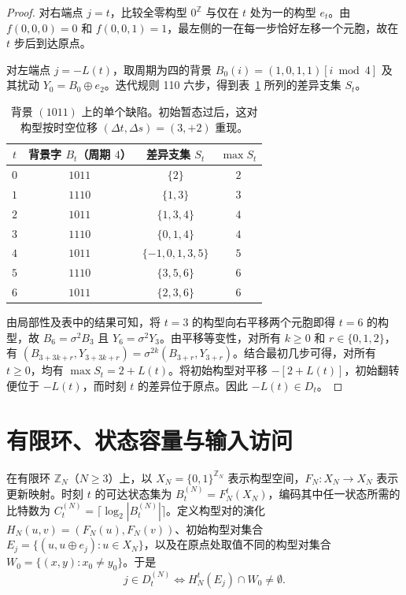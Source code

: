 \documentclass[11pt, a4paper]{article}
\begin{document}
\begin{proof}
对右端点 $j = t$，比较全零构型 $0^{\mathbb{Z}}$ 与仅在 $t$ 处为一的构型 $e_t$。由 $f(0, 0, 0) = 0$ 和 $f(0, 0, 1) = 1$，最左侧的一在每一步恰好左移一个元胞，故在 $t$ 步后到达原点。

对左端点 $j = -L(t)$，取周期为四的背景 $B_0(i) = (1, 0, 1, 1)[i \bmod 4]$ 及其扰动 $Y_0 = B_0 \oplus e_2$。迭代规则 110 六步，得到表~\ref{tab:period4_defect} 所列的差异支集 $S_t$。

\begin{table}[h]
\centering
\caption{背景 $(1011)$ 上的单个缺陷。初始暂态过后，这对构型按时空位移 $(\Delta t, \Delta s) = (3, +2)$ 重现。}
\label{tab:period4_defect}
\begin{tabular}{cccc}
\toprule
$t$ & 背景字 $B_t$（周期 $4$）& 差异支集 $S_t$ & $\max S_t$ \\
\midrule
$0$ & $1011$ & $\{2\}$ & $2$ \\
$1$ & $1110$ & $\{1, 3\}$ & $3$ \\
$2$ & $1011$ & $\{1, 3, 4\}$ & $4$ \\
$3$ & $1110$ & $\{0, 1, 4\}$ & $4$ \\
$4$ & $1011$ & $\{-1, 0, 1, 3, 5\}$ & $5$ \\
$5$ & $1110$ & $\{3, 5, 6\}$ & $6$ \\
$6$ & $1011$ & $\{2, 3, 6\}$ & $6$ \\
\bottomrule
\end{tabular}
\end{table}

由局部性及表中的结果可知，将 $t=3$ 的构型向右平移两个元胞即得 $t=6$ 的构型，故 $B_6 = \sigma^2 B_3$ 且 $Y_6 = \sigma^2 Y_3$。由平移等变性，对所有 $k \ge 0$ 和 $r \in \{0, 1, 2\}$，有 $(B_{3+3k+r}, Y_{3+3k+r}) = \sigma^{2k}(B_{3+r}, Y_{3+r})$。结合最初几步可得，对所有 $t \ge 0$，均有 $\max S_t = 2 + L(t)$。将初始构型对平移 $-[2 + L(t)]$，初始翻转便位于 $-L(t)$，而时刻 $t$ 的差异位于原点。因此 $-L(t) \in D_t$。
\end{proof}

\section{有限环、状态容量与输入访问}

在有限环 $\mathbb{Z}_N$（$N \ge 3$）上，以 $X_N = \{0, 1\}^{\mathbb{Z}_N}$ 表示构型空间，$F_N : X_N \to X_N$ 表示更新映射。时刻 $t$ 的可达状态集为 $B_t^{(N)} = F_N^t(X_N)$，编码其中任一状态所需的比特数为 $C_t^{(N)} = \lceil \log_2 |B_t^{(N)}| \rceil$。定义构型对的演化 $H_N(u, v) = (F_N(u), F_N(v))$、初始构型对集合 $E_j = \{ (u, u \oplus e_j) : u \in X_N \}$，以及在原点处取值不同的构型对集合 $W_0 = \{ (x, y) : x_0 \ne y_0 \}$。于是
\begin{equation}
j \in D_t^{(N)} \iff H_N^t(E_j) \cap W_0 \ne \emptyset.
\end{equation}
\end{document}
